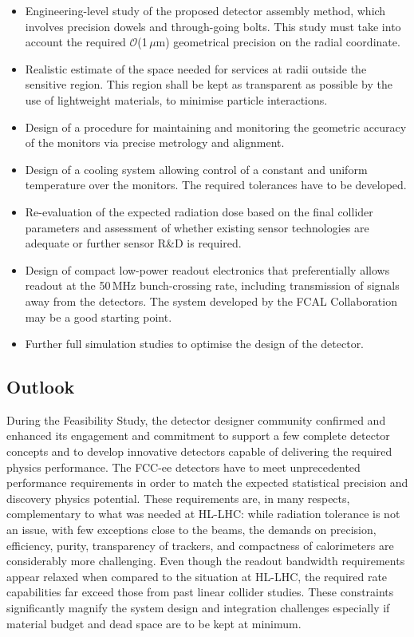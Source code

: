 \begin{itemize}
\item 
Engineering-level study of the proposed detector assembly method, which involves precision dowels and through-going bolts. 
This study must take into account the required $\mathcal{O}$(1\,$\mu$m) geometrical precision on the radial coordinate.
\item 
Realistic estimate of the space needed for services at radii outside the sensitive region. 
This region shall be kept as transparent as possible by the use of lightweight materials, to minimise particle interactions.
\item 
Design of a procedure for maintaining and monitoring the geometric accuracy of the monitors via precise metrology and alignment.
\item 
Design of a cooling system allowing control of a constant and uniform temperature over the monitors. 
The required tolerances have to be developed.
\item 
Re-evaluation of the expected radiation dose based on the final collider parameters 
and assessment of whether existing sensor technologies are adequate or further sensor R\&D is required.
\item 
Design of compact low-power readout electronics that preferentially allows readout at the 50\,MHz bunch-crossing rate, 
including transmission of signals away from the detectors. 
The system developed by the FCAL Collaboration may be a good starting point.
\item
Further full simulation studies to optimise the design of the detector.
\end{itemize}

\subsection{Outlook}

During the Feasibility Study, 
the detector designer community confirmed and enhanced its engagement and commitment 
to support a few complete detector concepts 
and to develop innovative detectors capable of delivering the required physics performance. 
The FCC-ee detectors have to meet unprecedented performance requirements 
in order to match the expected statistical precision and discovery physics potential. 
These requirements are, in many respects, complementary to what was needed at HL-LHC: 
while radiation tolerance is not an issue, with few exceptions close to the beams, 
the demands on precision, efficiency, purity, transparency of trackers, 
and compactness of calorimeters are considerably more challenging. 
Even though the readout bandwidth requirements appear relaxed when compared to the situation at HL-LHC, 
the required rate capabilities far exceed those from past linear collider studies. 
These constraints significantly magnify the system design and integration challenges 
especially if material budget and dead space are to be kept at minimum.

